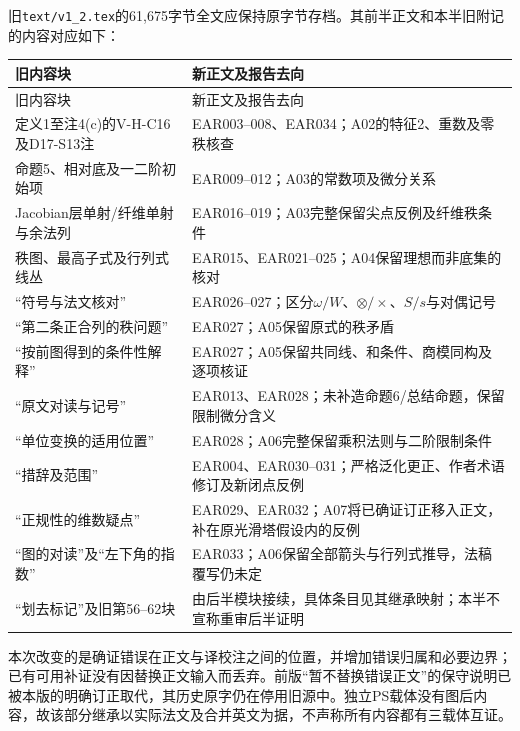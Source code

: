 旧\texttt{text/v1\_2.tex}的61,675字节全文应保持原字节存档。其前半正文和本半旧附记的内容对应如下：
\begin{longtable}{@{}p{}p{}@{}}
\toprule 旧内容块 & 新正文及报告去向\\\midrule\endfirsthead
\toprule 旧内容块 & 新正文及报告去向\\\midrule\endhead
定义1至注4(c)的V-H-C16及D17-S13注 & EAR003--008、EAR034；A02的特征2、重数及零秩核查\\
命题5、相对底及一二阶初始项 & EAR009--012；A03的常数项及微分关系\\
Jacobian层单射/纤维单射与余法列 & EAR016--019；A03完整保留尖点反例及纤维秩条件\\
秩图、最高子式及行列式线丛 & EAR015、EAR021--025；A04保留理想而非底集的核对\\
“符号与法文核对” & EAR026--027；区分$\omega/W$、$\otimes/\times$、$S/s$与对偶记号\\
“第二条正合列的秩问题” & EAR027；A05保留原式的秩矛盾\\
“按前图得到的条件性解释” & EAR027；A05保留共同线、和条件、商模同构及逐项核证\\
“原文对读与记号” & EAR013、EAR028；未补造命题6/总结命题，保留限制微分含义\\
“单位变换的适用位置” & EAR028；A06完整保留乘积法则与二阶限制条件\\
“措辞及范围” & EAR004、EAR030--031；严格泛化更正、作者术语修订及新闭点反例\\
“正规性的维数疑点” & EAR029、EAR032；A07将已确证订正移入正文，补在原光滑塔假设内的反例\\
“图的对读”及“左下角的指数” & EAR033；A06保留全部箭头与行列式推导，法稿覆写仍未定\\
“划去标记”及旧第56--62块 & 由后半模块接续，具体条目见其继承映射；本半不宣称重审后半证明\\
\bottomrule
\end{longtable}

本次改变的是确证错误在正文与译校注之间的位置，并增加错误归属和必要边界；已有可用补证没有因替换正文输入而丢弃。前版“暂不替换错误正文”的保守说明已被本版的明确订正取代，其历史原字仍在停用旧源中。独立PS载体没有图后内容，故该部分继承以实际法文及合并英文为据，不声称所有内容都有三载体互证。
\endgroup
